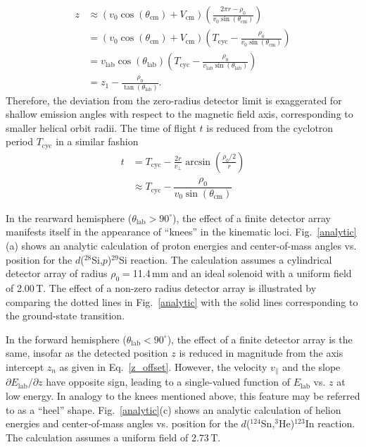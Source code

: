 \begin{equation}
\begin{split}
z&\approx(v_{0}\cos(\theta_\mathrm{cm})+V_\mathrm{cm})\left(\frac{2\pi r-\rho_0}{v_0\sin(\theta_\mathrm{cm})}\right)\\
	 &=(v_{0}\cos(\theta_\mathrm{cm})+V_\mathrm{cm})\left(T_\mathrm{cyc}-\frac{\rho_0}{v_{0}\sin(\theta_\mathrm{cm})}\right)\\
&=v_\mathrm{lab}\cos(\theta_\mathrm{lab})\left(T_\mathrm{cyc}-\frac{\rho_0}{v_\mathrm{lab}\sin(\theta_\mathrm{lab})}\right)\\
&= z_1-\frac{\rho_0}{\tan(\theta_\mathrm{lab})}.
\end{split}	
\label{z_offset}
\end{equation}
Therefore, the deviation from the zero-radius detector limit is exaggerated for shallow emission angles with respect to the magnetic field axis, corresponding to smaller helical orbit radii.  The time of flight $t$ is reduced from the cyclotron period $T_\mathrm{cyc}$ in a similar fashion
\begin{equation}
\begin{split}
t&=T_\mathrm{cyc}-\frac{2r}{v_\perp}\arcsin\left(\frac{\rho_0/2}{r}\right) \\
&\approx T_\mathrm{cyc}-\dfrac{\rho_0}{v_0 \sin(\theta_\mathrm{cm})}
\end{split}
\label{time_of_flight}
\end{equation}

In the rearward hemisphere ($\theta_\mathrm{lab}>90^\circ$), the effect of a finite detector array manifests itself in the appearance of ``knees'' %
 in the kinematic loci.  Fig.~\ref{analytic}(a) shows an analytic calculation of proton energies and center-of-mass angles vs. position for the $d$($^{28}$Si,$p$)$^{29}$Si reaction. The calculation assumes a cylindrical detector array of radius $\rho_0=$11.4\,mm and an ideal solenoid with a uniform field of 2.00\,T.  The effect of a non-zero radius detector array is illustrated by comparing the dotted lines in Fig.~\ref{analytic} with the solid lines corresponding to the ground-\-state transition.
 
In the forward hemisphere ($\theta_\mathrm{lab}<90^\circ$), the effect of a finite detector array is the same, insofar as the detected position $z$ is reduced in magnitude from the axis intercept $z_n$ as given in Eq.~\ref{z_offset}.  However, the velocity $v_\parallel$ and the slope $\partial E_\mathrm{lab}/\partial z$ have opposite sign, leading to a single-valued function of $E_\mathrm{lab}$ vs. $z$ at low energy.  In analogy to the knees mentioned above, this feature may be referred to as a ``heel'' shape.  Fig.~\ref{analytic}(c) shows an analytic calculation of helion energies and center-of-mass angles vs. position for the $d$($^{124}$Sn,$^3$He)$^{123}$In reaction. The calculation assumes a uniform field of 2.73\,T.

